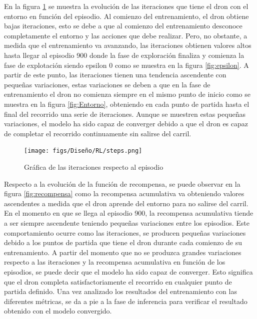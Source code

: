 En la figura \ref{fig:iteraciones} 
se muestra la evolución de las iteraciones que tiene el dron con el entorno en función del episodio. Al comienzo del entrenamiento, el dron obtiene bajas iteraciones, esto se debe a que 
al comienzo del entrenamiento desconoce completamente el entorno y las acciones que debe realizar. Pero, no obstante, a medida que el entrenamiento va avanzando, 
las iteraciones obtienen valores altos hasta llegar al episodio
900 donde la fase de exploración finaliza y comienza la fase de explotación siendo epsilon 0 como se muestra en la figura \ref{fig:epsilon}. A partir de este punto, las iteraciones tienen 
una tendencia ascendente con pequeñas variaciones, estas variaciones se deben a que en la fase de entrenamiento el dron no comienza siempre en el mismo punto de inicio como 
se muestra en la figura \ref{fig:Entorno}, obteniendo en cada punto de partida hasta el final del recorrido una serie de iteraciones. Aunque se muestren estas pequeñas variaciones, el modelo
ha sido capaz de converger debido a que el dron es capaz de completar el recorrido continuamente sin salirse del carril.

\begin{figure} [H]
  \begin{center}
    \texttt{[image: figs/Diseño/RL/steps.png]}
  \end{center}
  \caption{Gráfica de las iteraciones respecto al episodio}
  \label{fig:iteraciones}
  \vspace{-1.5em}
\end{figure}

Respecto a la evolución de la función de recompensa, se puede observar en la figura \ref{fig:recompensa} como la recompensa acumulativa va obteniendo valores ascendentes a medida que el dron 
aprende del entorno para no salirse del carril. En el momento en que se llega al episodio 900, la recompensa acumulativa tiende a ser siempre ascendente teniendo pequeñas variaciones entre los 
episodios. Este comportamiento ocurre como las iteraciones, se producen pequeñas variaciones debido a los puntos de partida que tiene el dron durante cada comienzo de su entrenamiento. A partir 
del momento 
que no se produzca grandes variaciones respecto a las iteraciones y la recompensa acumulativa en función de los episodios, se puede decir que el modelo ha sido capaz de converger. Esto significa
que el dron completa satisfactoriamente el recorrido en cualquier punto de partida definido. Una vez analizado los resultados del entrenamiento con las diferentes métricas, se da a pie a la 
fase de inferencia para verificar el resultado obtenido con el modelo convergido.

